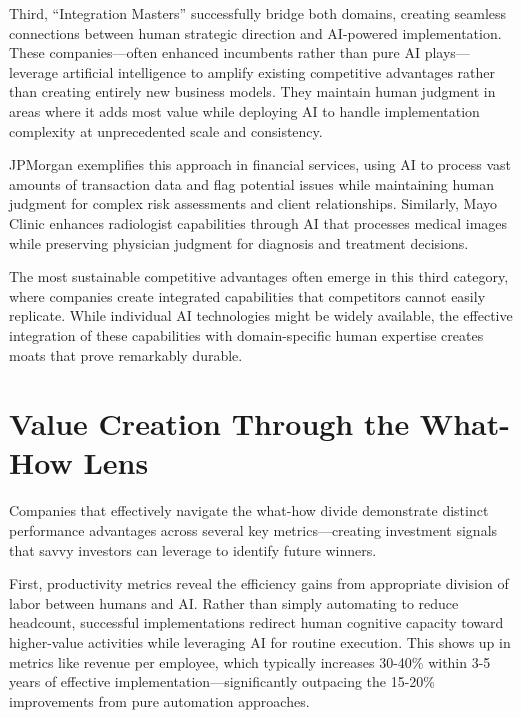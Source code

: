 \documentclass[
  Letterpaper,
]{scrbook}
\begin{document}
Third, ``Integration Masters''
successfully bridge both domains, creating seamless connections between
human strategic direction and AI-powered implementation. These
companies---often enhanced incumbents rather than pure AI
plays---leverage artificial intelligence to amplify existing competitive
advantages rather than creating entirely new business models. They
maintain human judgment in areas where it adds most value while
deploying AI to handle implementation complexity at unprecedented scale
and consistency.

JPMorgan exemplifies this approach in
financial services, using AI to process vast
amounts of transaction data and flag potential issues while maintaining
human judgment for complex risk assessments and client relationships.
Similarly, Mayo Clinic enhances
radiologist capabilities through AI that processes medical images while
preserving physician judgment for diagnosis and treatment decisions.

The most sustainable competitive advantages often emerge in this third
category, where companies create integrated capabilities that
competitors cannot easily replicate. While individual AI technologies
might be widely available, the effective integration of these
capabilities with domain-specific human expertise creates moats that
prove remarkably durable.

\section{\texorpdfstring{Value Creation
Through the What-How
Lens}{Value Creation Through the What-How Lens}}\label{value-creation-through-the-what-how-lens}

Companies that effectively navigate the what-how divide demonstrate
distinct performance advantages across several key metrics---creating
investment signals that savvy investors can leverage to identify future
winners.

First, productivity metrics reveal
the efficiency gains from appropriate division of labor between humans
and AI. Rather than simply automating to reduce headcount, successful
implementations redirect human cognitive capacity toward higher-value
activities while leveraging AI for routine execution. This shows up in
metrics like revenue per employee, which typically increases 30-40\%
within 3-5 years of effective implementation---significantly outpacing
the 15-20\% improvements from pure automation approaches.
\end{document}
